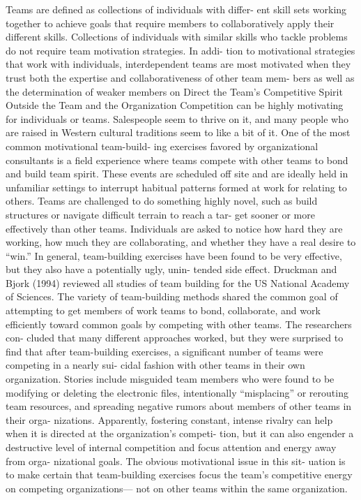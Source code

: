 Teams are defined as collections of individuals with differ- ent skill sets working together to achieve goals that require members to collaboratively apply their different skills. Collections of individuals with similar skills who tackle problems do not require team motivation strategies. In addi- tion to motivational strategies that work with individuals, interdependent teams are most motivated when they trust both the expertise and collaborativeness of other team mem- bers as well as the determination of weaker members on Direct the Team’s Competitive Spirit Outside the Team and the Organization
Competition can be highly motivating for individuals or teams. Salespeople seem to thrive on it, and many people who are raised in Western cultural traditions seem to like a bit of it. One of the most common motivational team-build- ing exercises favored by organizational consultants is a field experience where teams compete with other teams to bond and build team spirit. These events are scheduled off site and are ideally held in unfamiliar settings to interrupt habitual patterns formed at work for relating to others. Teams are challenged to do something highly novel, such as build structures or navigate difficult terrain to reach a tar- get sooner or more effectively than other teams. Individuals are asked to notice how hard they are working, how much they are collaborating, and whether they have a real desire to “win.”
In general, team-building exercises have been found to be very effective, but they also have a potentially ugly, unin- tended side effect. Druckman and Bjork (1994) reviewed all studies of team building for the US National Academy of Sciences. The variety of team-building methods shared the common goal of attempting to get members of work teams to bond, collaborate, and work efficiently toward common goals by competing with other teams. The researchers con- cluded that many different approaches worked, but they were surprised to find that after team-building exercises, a significant number of teams were competing in a nearly sui- cidal fashion with other teams in their own organization. Stories include misguided team members who were found to be modifying or deleting the electronic files, intentionally “misplacing” or rerouting team resources, and spreading negative rumors about members of other teams in their orga- nizations. Apparently, fostering constant, intense rivalry can help when it is directed at the organization’s competi- tion, but it can also engender a destructive level of internal competition and focus attention and energy away from orga- nizational goals. The obvious motivational issue in this sit- uation is to make certain that team-building exercises focus the team’s competitive energy on competing organizations— not on other teams within the same organization.


